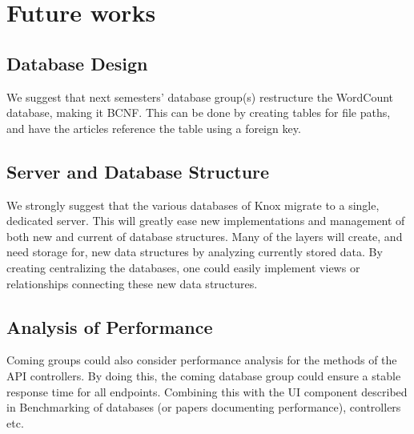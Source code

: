 \section{Future works}
\subsection{Database Design}
We suggest that next semesters' database group(s) restructure the WordCount database, making it BCNF. 
This can be done by creating tables for file paths, and have the articles reference the table using a foreign key.

\subsection{Server and Database Structure}
We strongly suggest that the various databases of Knox migrate to a single, dedicated server.
This will greatly ease new implementations and management of both new and current of database structures.
Many of the layers will create, and need storage for, new data structures by analyzing currently stored data.
By creating centralizing the \knox{} databases, one could easily implement views or relationships connecting these new data structures.

\subsection{Analysis of Performance}
Coming groups could also consider performance analysis for the methods of the API controllers. 
By doing this, the coming database group could ensure a stable response time for all endpoints. Combining this with the UI component described in  
Benchmarking of databases (or papers documenting performance), controllers etc. 

